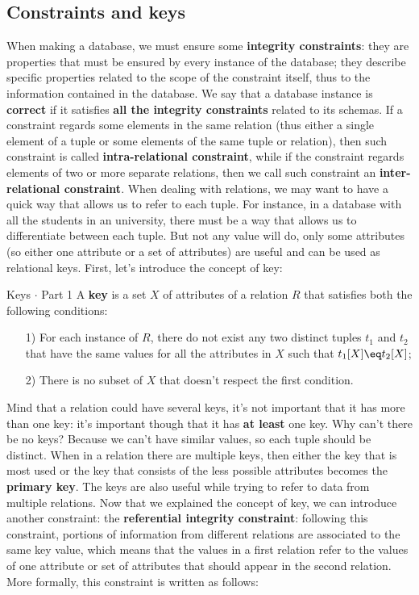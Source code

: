 \subsection{Constraints and keys}

When making a database, we must ensure some \textbf{integrity constraints}: they are properties that must be ensured by every instance of the database; they describe specific properties related to the scope of the constraint itself, thus to the information contained in the database. We say that a database instance is \textbf{correct} if it satisfies \textbf{all the integrity constraints} related to its schemas.
\nwl
If a constraint regards some elements in the same relation (thus either a single element of a tuple or some elements of the same tuple or relation), then such constraint is called \textbf{intra-relational constraint}, while if the constraint regards elements of two or more separate relations, then we call such constraint an \textbf{inter-relational constraint}.
\nwl
When dealing with relations, we may want to have a quick way that allows us to refer to each tuple. For instance, in a database with all the students in an university, there must be a way that allows us to differentiate between each tuple. But not any value will do, only some attributes (so either one attribute or a set of attributes) are useful and can be used as relational keys. First, let's introduce the concept of key:
\begin{definition}{Keys $\cdot$ Part 1}
    A \textbf{key} is a set $X$ of attributes of a relation $R$ that satisfies both the following conditions:
    \begin{itemize}
        \item [1)] For each instance of $R$, there do not exist any two distinct tuples $t_1$ and $t_2$ that have the same values for all the attributes in $X$ such that $t_1[X] \eq t_2[X]$;
        \item [2)] There is no subset of $X$ that doesn't respect the first condition.
    \end{itemize}
\end{definition}

Mind that a relation could have several keys, it's not important that it has more than one key: it's important though that it has \textbf{at least} one key. Why can't there be no keys? Because we can't have similar values, so each tuple should be distinct. When in a relation there are multiple keys, then either the key that is most used or the key that consists of the less possible attributes becomes the \textbf{primary key}. The keys are also useful while trying to refer to data from multiple relations.
\nwl
Now that we explained the concept of key, we can introduce another constraint: the \textbf{referential integrity constraint}: following this constraint, portions of information from different relations are associated to the same key value, which means that the values in a first relation refer to the values of one attribute or set of attributes that should appear in the second relation. More formally, this constraint is written as follows:

